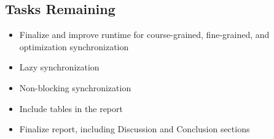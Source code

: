 \documentclass[conference]{IEEEtran}
\begin{document}
\subsection*{Tasks Remaining}
\begin{itemize}
    \item Finalize and improve runtime for course-grained, fine-grained, and optimization synchronization
    \item Lazy synchronization
    \item Non-blocking synchronization
    \item Include tables in the report
    \item Finalize report, including Discussion and Conclusion sections
    
\end{itemize}

{}

\end{document}
